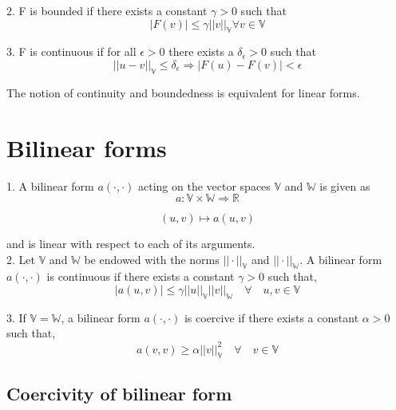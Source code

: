 \documentclass[a4paper]{book}
\begin{document}
2. F is bounded if there exists a constant $\gamma > 0$ such that
\begin{equation} 
|F(v)| \leq \gamma ||v||_\mathbb{V} \forall v \in \mathbb{V}
\end{equation}

3. F is continuous if for all $\epsilon > 0$ there exists a $\delta_\epsilon > 0$ such that \\
\begin{equation}
||u - v||_\mathbb{V} \leq \delta_\epsilon \Rightarrow  |F(u) - F(v)| < \epsilon
\end{equation}

The notion of continuity and boundedness is equivalent for linear forms.

\section{Bilinear forms}

1. A bilinear form $a(\cdot,\cdot)$ acting on the vector spaces $\mathbb{V}$ and $\mathbb{W}$ is given as
\begin{equation}
a : \mathbb{V} \times \mathbb{W} \Rightarrow \mathbb{R}
\end{equation}

\begin{equation}
(u,v) \mapsto a(u,v)
\end{equation}

and is linear with respect to each of its arguments.\\

2. Let $\mathbb{V}$ and $\mathbb{W}$ be endowed with the norms $||\cdot||_\mathbb{V}$ and $||\cdot||_\mathbb{W}$. A bilinear form $a(\cdot,\cdot)$ is continuous if there exists a constant $\gamma > 0$ such that,
\begin{equation}
|a(u,v)| \leq \gamma ||u||_\mathbb{V} ||v||_\mathbb{W} \quad \forall \quad u,v \in \mathbb{V}
\end{equation}

3. If $\mathbb{V} = \mathbb{W}$, a bilinear form $a(\cdot,\cdot)$ is coercive if there exists a constant $\alpha > 0$ such that,
\begin{equation}
a(v,v) \geq \alpha ||v||_\mathbb{V}^2  \quad \forall \quad v \in  \mathbb{V}
\end{equation}

\subsection{Coercivity of bilinear form} \label{Coercivity_constant}
\end{document}

